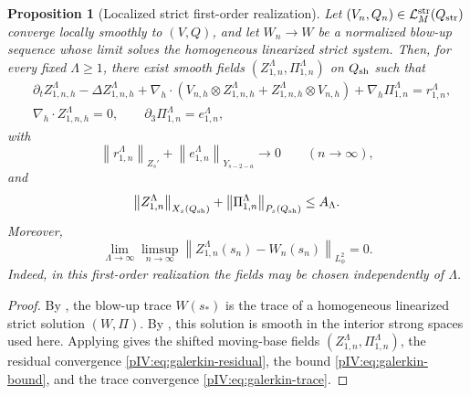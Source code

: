 \documentclass[11pt]{article}
\numberwithin{equation}{section}
\theoremstyle{plain}
\newtheorem{proposition}{Proposition}[section]
\theoremstyle{definition}
\theoremstyle{remark}
\newcommand{\nabh}{\nabla_h}
\newcommand{\divh}{\nabla_h\!\cdot}
\newcommand{\norm}[2]{\left\|#1\right\|_{#2}}
\newcommand{\Lstr}{\mathcal L^{\rm str}}
\begin{document}
\begin{proposition}[Localized strict first-order realization]\label{pIV:prop:strict-galerkin-density}
Let \((V_n,Q_n)\in\Lstr_M(Q_{\rm str})\) converge locally smoothly to \((V,Q)\), and
let \(W_n\to W\) be a normalized blow-up sequence whose limit solves the homogeneous
linearized strict system.  Then, for every fixed \(\Lambda\ge1\), there exist smooth
fields \((Z_{1,n}^\Lambda,\Pi_{1,n}^\Lambda)\) on \(Q_{\rm sh}\) such that
\begin{align}
        &\partial_t Z_{1,n,h}^\Lambda-
        \Delta Z_{1,n,h}^\Lambda
        +\nabh\cdot(V_{n,h}\otimes Z_{1,n,h}^\Lambda
        +Z_{1,n,h}^\Lambda\otimes V_{n,h})
        +\nabh\Pi_{1,n}^\Lambda
        =r_{1,n}^\Lambda,\label{pIV:eq:galerkin-linear}\\
        &\divh Z_{1,n,h}^\Lambda=0,
        \qquad
        \partial_3\Pi_{1,n}^\Lambda=e_{1,n}^\Lambda,
        \label{pIV:eq:galerkin-pressure}
\end{align}
with
\begin{equation}\label{pIV:eq:galerkin-residual}
        \norm{r_{1,n}^\Lambda}{Z_s'}+\norm{e_{1,n}^\Lambda}{Y_{s-2-a}}\to0
        \qquad(n\to\infty),
\end{equation}
and
\begin{equation}\label{pIV:eq:galerkin-bound}
        \norm{Z_{1,n}^\Lambda}{X_s(Q_{\rm sh})}
        +\norm{\Pi_{1,n}^\Lambda}{P_s(Q_{\rm sh})}
        \le A_\Lambda .
\end{equation}
Moreover,
\begin{equation}\label{pIV:eq:galerkin-trace}
        \lim_{\Lambda\to\infty}\limsup_{n\to\infty}
        \norm{Z_{1,n}^\Lambda(s_n)-W_n(s_n)}{L^2_\phi}=0.
\end{equation}
Indeed, in this first-order realization the fields may be chosen independently of
\(\Lambda\).
\end{proposition}

\begin{proof}
By , the blow-up trace \(W(s_*)\) is the trace of a
homogeneous linearized strict solution \((W,\Pi)\).  By
, this solution is smooth in the interior strong
spaces used here.  Applying  gives the shifted
moving-base fields \((Z_{1,n}^\Lambda,\Pi_{1,n}^\Lambda)\), the residual convergence
\eqref{pIV:eq:galerkin-residual}, the bound \eqref{pIV:eq:galerkin-bound}, and the trace
convergence \eqref{pIV:eq:galerkin-trace}.
\end{proof}
\end{document}
